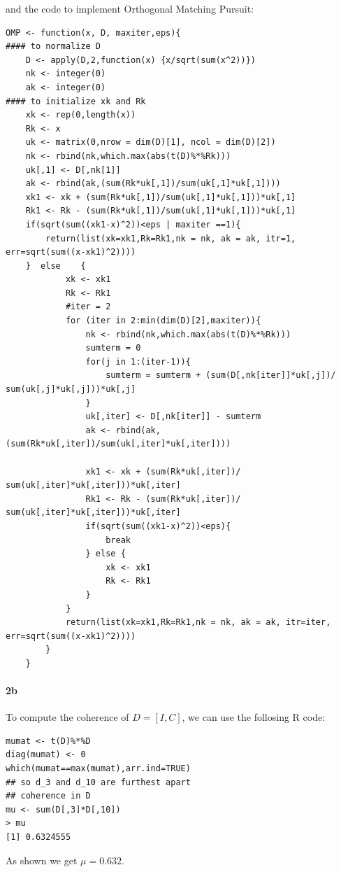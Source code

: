 \documentclass[12pt, leqno]{article}
\begin{document}
and the code to implement Orthogonal Matching Pursuit:
\begin{verbatim}
OMP <- function(x, D, maxiter,eps){
#### to normalize D
    D <- apply(D,2,function(x) {x/sqrt(sum(x^2))})
    nk <- integer(0)
    ak <- integer(0)
#### to initialize xk and Rk
    xk <- rep(0,length(x))
    Rk <- x
    uk <- matrix(0,nrow = dim(D)[1], ncol = dim(D)[2])
    nk <- rbind(nk,which.max(abs(t(D)%*%Rk)))
    uk[,1] <- D[,nk[1]]
    ak <- rbind(ak,(sum(Rk*uk[,1])/sum(uk[,1]*uk[,1])))
    xk1 <- xk + (sum(Rk*uk[,1])/sum(uk[,1]*uk[,1]))*uk[,1]
    Rk1 <- Rk - (sum(Rk*uk[,1])/sum(uk[,1]*uk[,1]))*uk[,1]
    if(sqrt(sum((xk1-x)^2))<eps | maxiter ==1){
        return(list(xk=xk1,Rk=Rk1,nk = nk, ak = ak, itr=1,
err=sqrt(sum((x-xk1)^2))))
    }  else    {
            xk <- xk1
            Rk <- Rk1
            #iter = 2
            for (iter in 2:min(dim(D)[2],maxiter)){
                nk <- rbind(nk,which.max(abs(t(D)%*%Rk)))
                sumterm = 0
                for(j in 1:(iter-1)){
                    sumterm = sumterm + (sum(D[,nk[iter]]*uk[,j])/
sum(uk[,j]*uk[,j]))*uk[,j]
                }
                uk[,iter] <- D[,nk[iter]] - sumterm
                ak <- rbind(ak,(sum(Rk*uk[,iter])/sum(uk[,iter]*uk[,iter])))

                xk1 <- xk + (sum(Rk*uk[,iter])/
sum(uk[,iter]*uk[,iter]))*uk[,iter]
                Rk1 <- Rk - (sum(Rk*uk[,iter])/
sum(uk[,iter]*uk[,iter]))*uk[,iter]
                if(sqrt(sum((xk1-x)^2))<eps){
                    break
                } else {
                    xk <- xk1
                    Rk <- Rk1
                }        
            }
            return(list(xk=xk1,Rk=Rk1,nk = nk, ak = ak, itr=iter,
err=sqrt(sum((x-xk1)^2))))          
        }
    }
\end{verbatim}

\paragraph{2b}
To compute the coherence of $D = [I, C]$, we can use the follosing R code:
\begin{verbatim}
mumat <- t(D)%*%D
diag(mumat) <- 0
which(mumat==max(mumat),arr.ind=TRUE)
## so d_3 and d_10 are furthest apart
## coherence in D
mu <- sum(D[,3]*D[,10])
> mu
[1] 0.6324555
\end{verbatim}

As shown we get $\mu = 0.632$.
\end{document}
